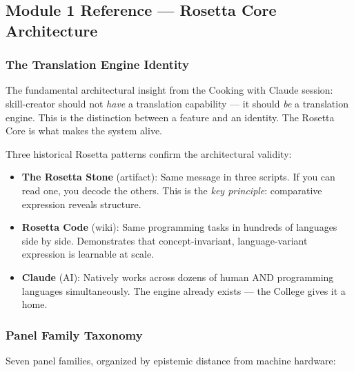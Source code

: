 \documentclass[11pt,letterpaper]{article}
\begin{document}
\subsection{Module 1 Reference --- Rosetta Core Architecture}

\subsubsection{The Translation Engine Identity}

The fundamental architectural insight from the Cooking with Claude session: skill-creator should not \textit{have} a translation capability --- it should \textit{be} a translation engine. This is the distinction between a feature and an identity. The Rosetta Core is what makes the system alive.

Three historical Rosetta patterns confirm the architectural validity:
\begin{itemize}[leftmargin=1.5em]
  \item \textbf{The Rosetta Stone} (artifact): Same message in three scripts. If you can read one, you decode the others. This is the \textit{key principle}: comparative expression reveals structure.
  \item \textbf{Rosetta Code} (wiki): Same programming tasks in hundreds of languages side by side. Demonstrates that concept-invariant, language-variant expression is learnable at scale.
  \item \textbf{Claude} (AI): Natively works across dozens of human AND programming languages simultaneously. The engine already exists --- the College gives it a home.
\end{itemize}

\subsubsection{Panel Family Taxonomy}

Seven panel families, organized by epistemic distance from machine hardware:
\end{document}
